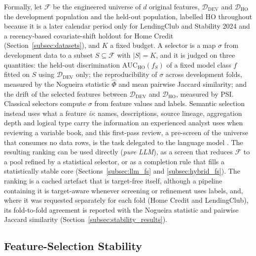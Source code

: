 \documentclass[final,5p,twocolumn]{elsarticle}
\newcommand{\Kfeat}{K}
\newcommand{\AUC}{\mathrm{AUC}}
\begin{document}
Formally, let $\mathcal{F}$ be the engineered universe of $d$ original features, $\mathcal{D}_{\mathrm{DEV}}$ and $\mathcal{D}_{\mathrm{HO}}$ the development population and the held-out population, labelled HO throughout because it is a later calendar period only for LendingClub and Stability 2024 and a recency-based covariate-shift holdout for Home Credit (Section~\ref{subsec:datasets}), and $\Kfeat$ a fixed budget. A selector is a map $\sigma$ from development data to a subset $S\subseteq\mathcal{F}$ with $|S|=\Kfeat$, and it is judged on three quantities: the held-out discrimination $\AUC_{\mathrm{HO}}(f_S)$ of a fixed model class $f$ fitted on $S$ using $\mathcal{D}_{\mathrm{DEV}}$ only; the reproducibility of $\sigma$ across development folds, measured by the Nogueira statistic $\hat\Phi$ and mean pairwise Jaccard similarity; and the drift of the selected features between $\mathcal{D}_{\mathrm{DEV}}$ and $\mathcal{D}_{\mathrm{HO}}$, measured by PSI. Classical selectors compute $\sigma$ from feature values and labels. Semantic selection instead uses what a feature \emph{is}: names, descriptions, source lineage, aggregation depth and logical type carry the information an experienced analyst uses when reviewing a variable book, and this first-pass review, a pre-screen of the universe that consumes no data rows, is the task delegated to the language model \cite{jeong2025,li2025sigkdd}. The resulting ranking can be used directly (\emph{pure LLM}), as a screen that reduces $\mathcal{F}$ to a pool refined by a statistical selector, or as a completion rule that fills a statistically stable core (Sections~\ref{subsec:llm_fs} and \ref{subsec:hybrid_fs}). The ranking is a cached artefact that is target-free itself, although a pipeline containing it is target-aware whenever screening or refinement uses labels, and, where it was requested separately for each fold (Home Credit and LendingClub), its fold-to-fold agreement is reported with the Nogueira statistic and pairwise Jaccard similarity (Section~\ref{subsec:stability_results}).

\subsection{Feature-Selection Stability}
\label{subsec:fs_stability_background}
\end{document}
